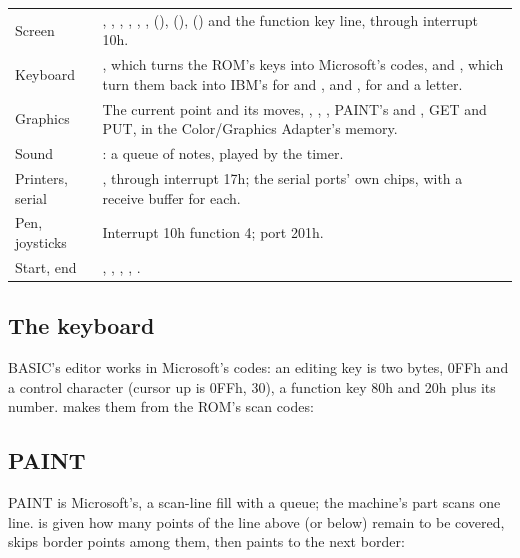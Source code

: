 \begin{tabularx}{\textwidth}{@{}P{1.0in}Y@{}}
\toprule
Screen & , , ,
, , , 
(),  (), 
() and the function key line, through interrupt 10h.\\
Keyboard & , which turns the ROM's keys into
Microsoft's codes,  and , which turn them
back into IBM's for  and , and
, for  and a letter.\\
Graphics & The current point and its moves, ,
, , PAINT's  and
, GET and PUT, in the Color/Graphics Adapter's memory.\\
Sound & : a queue of notes, played by the timer.\\
Printers, serial & , through interrupt 17h; the serial
ports' own chips, with a receive buffer for each.\\
Pen, joysticks & Interrupt 10h function 4; port 201h.\\
Start, end & , , ,
, .\\
\bottomrule
\end{tabularx}

\subsection{The keyboard} BASIC's editor works in Microsoft's codes: an
editing key is two bytes, 0FFh and a control character (cursor up is
0FFh, 30), a function key 80h and 20h plus its number. 
makes them from the ROM's scan codes:



\subsection{PAINT} PAINT is Microsoft's, a scan-line fill with a queue;
the machine's part scans one line.  is given how many
points of the line above (or below) remain to be covered, skips border
points among them, then paints to the next border:

